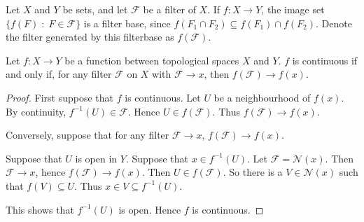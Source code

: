 \documentclass{owmaths}
\begin{document}
\begin{definition}
    Let $X$ and $Y$ be sets, and let $\mathcal{F}$ be a filter of $X$.
    If $f:X\rightarrow Y$, the image set $\{f(F)\;:\;F \in \mathcal{F}\}$
    is a filter base, since $f(F_1\cap F_2) \subseteq f(F_1)\cap f(F_2)$. 
    Denote the filter generated by this filterbase as $f(\mathcal{F})$.
\end{definition}

\begin{proposition}
    Let $f:X\rightarrow Y$ be a function between topological spaces $X$ and $Y$.    
    $f$ is continuous if and only if, for any filter $\mathcal{F}$
    on $X$ with $\mathcal{F} \rightarrow x$, then $f(\mathcal{F}) \rightarrow f(x)$.
\end{proposition}
\begin{proof}
    First suppose that $f$ is continuous. Let $U$
    be a neighbourhood of $f(x)$. By continuity, $f^{-1}(U) \in \mathcal{F}$.
    Hence $U \in f(\mathcal{F})$. Thus $f(\mathcal{F}) \rightarrow f(x)$.
    
    Conversely, suppose that for any filter $\mathcal{F}\rightarrow x$,
    $f(\mathcal{F})\rightarrow f(x)$. 
    
    Suppose that $U$ is open in $Y$. Suppose that $x \in f^{-1}(U)$. 
    Let $\mathcal{F} = \mathcal{N}(x)$. Then $\mathcal{F}\rightarrow x$,
    hence $f(\mathcal{F})\rightarrow f(x)$. Then $U \in f(\mathcal{F})$. 
    So there is a $V \in \mathcal{N}(x)$ such that $f(V) \subseteq U$.
    Thus $x \in V \subseteq f^{-1}(U)$.
    
    This shows that $f^{-1}(U)$ is open. Hence $f$ is continuous.
\end{proof}
\end{document}
